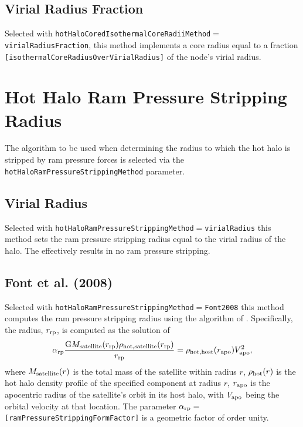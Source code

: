 \subsection{Virial Radius Fraction}

Selected with {\tt hotHaloCoredIsothermalCoreRadiiMethod}$=${\tt virialRadiusFraction}, this method implements a core radius equal to a fraction {\tt [isothermalCoreRadiusOverVirialRadius]} of the node's virial radius.

\section{Hot Halo Ram Pressure Stripping Radius}\label{sec:HotHaloRamPressureStrip}

The algorithm to be used when determining the radius to which the hot halo is stripped by ram pressure forces is selected via the {\tt hotHaloRamPressureStrippingMethod} parameter.

\subsection{Virial Radius}

Selected with {\tt hotHaloRamPressureStrippingMethod}$=${\tt virialRadius} this method sets the ram pressure stripping radius equal to the virial radius of the halo. The effectively results in no ram pressure stripping.


\subsection{Font et al. (2008)}

Selected with {\tt hotHaloRamPressureStrippingMethod}$=${\tt Font2008} this method computes the ram pressure stripping radius using the algorithm of \cite{font_colours_2008}. Specifically, the radius, $r_{\rm rp}$, is computed as the solution of
\begin{equation}
\alpha_{\rm rp} {{\rm G} M_{\rm satellite}(r_{\rm rp}) \rho_{\rm hot, satellite}(r_{\rm rp}) \over r_{\rm rp} } = \rho_{\rm hot, host}(r_{\rm apo}) V_{\rm apo}^2,
\end{equation}
where $M_{\rm satellite}(r)$ is the total mass of the satellite within radius $r$, $\rho_{\rm hot}(r)$ is the hot halo density profile of the specified component at radius $r$, $r_{\rm apo}$ is the apocentric radius of the satellite's orbit in its host halo, with $V_{\rm apo}$ being the orbital velocity at that location. The parameter $\alpha_{\rm rp}=${\tt [ramPressureStrippingFormFactor]} is a geometric factor of order unity.


